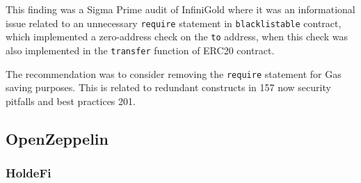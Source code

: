 This finding was a Sigma Prime audit of InfiniGold where it was an
informational issue related to an unnecessary \texttt{require} statement
in \texttt{blacklistable} contract, which implemented a zero-address
check on the \texttt{to} address, when this check was also implemented
in the \texttt{transfer} function of ERC20 contract.

The recommendation was to consider removing the \texttt{require}
statement for Gas saving purposes. This is related to redundant
constructs in 157 now security pitfalls and best practices 201.

\subsection{OpenZeppelin}\label{openzeppelin}

\subsubsection{HoldeFi}\label{holdefi}

